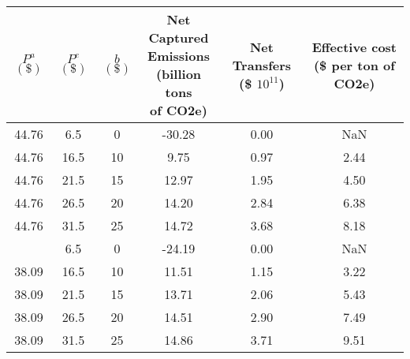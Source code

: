 
\begin{tabular}[t]{cccccc}
\toprule
\makecell[c]{$P^a$ \\ $(\$)$} & \makecell[c]{$P^e$ \\ $(\$)$} & \makecell[c]{$b$ \\ $(\$)$} & \makecell[c]{Net Captured \\ Emissions \\ (billion tons \\ of CO2e)} & \makecell[c]{Net Transfers \\ (\$ $10^{11}$)} & \makecell[c]{Effective cost \\ (\$ per ton \\ of CO2e)}\\
\midrule
44.76 & 6.5 & 0 & -30.28 & 0.00 & NaN \\
44.76 & 16.5 & 10 & 9.75 & 0.97 & 2.44 \\
44.76 & 21.5 & 15 & 12.97 & 1.95 & 4.50 \\
44.76 & 26.5 & 20 & 14.20 & 2.84 & 6.38 \\
44.76 & 31.5 & 25 & 14.72 & 3.68 & 8.18 \\
\addlinespace
38.09 & 6.5 & 0 & -24.19 & 0.00 & NaN \\
38.09 & 16.5 & 10 & 11.51 & 1.15 & 3.22 \\
38.09 & 21.5 & 15 & 13.71 & 2.06 & 5.43 \\
38.09 & 26.5 & 20 & 14.51 & 2.90 & 7.49 \\
38.09 & 31.5 & 25 & 14.86 & 3.71 & 9.51 \\
\bottomrule
\end{tabular}
